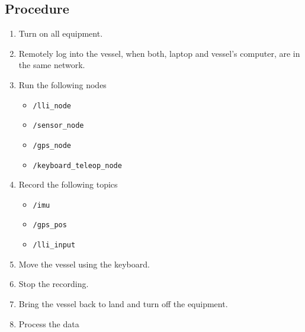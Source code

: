 \subsection*{Procedure}
\begin{enumerate}
	\item Turn on all equipment.
    \item Remotely log into the vessel, when both, laptop and vessel's computer, are in the same network.
	\item Run the following nodes
		\begin{itemize}
			\item \lstinline[style=cinline]{/lli_node}
            \item \lstinline[style=cinline]{/sensor_node}
            \item \lstinline[style=cinline]{/gps_node}
			\item \lstinline[style=cinline]{/keyboard_teleop_node}
		\end{itemize}
    \item Record the following topics
        \begin{itemize}
            \item \lstinline[style=cinline]{/imu}
            \item \lstinline[style=cinline]{/gps_pos}
            \item \lstinline[style=cinline]{/lli_input}        
        \end{itemize}
	\item Move the vessel using the keyboard.
	\item Stop the recording.
    \item Bring the vessel back to land and turn off the equipment.
    \item Process the data
\end{enumerate}


